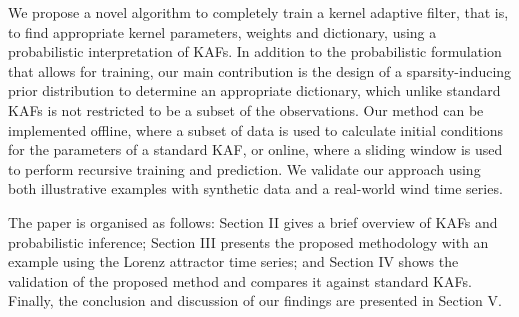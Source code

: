 We propose a novel algorithm to completely train a kernel adaptive filter, that is, to find appropriate kernel parameters, weights and dictionary, using a probabilistic interpretation of KAFs. In addition to the probabilistic formulation that allows for training, our main contribution is the design of a sparsity-inducing prior distribution to determine an appropriate dictionary, which unlike standard KAFs is not restricted to be a subset of the observations. Our method can be implemented offline, where a subset of data is used to calculate initial conditions for the parameters of a standard KAF, or online, where a sliding window is used to perform recursive training and prediction.  We validate our approach using both illustrative examples with synthetic data and a real-world wind time series.

The paper is organised as follows: Section II gives a brief overview of KAFs and probabilistic inference; Section III presents the proposed methodology with an example using the Lorenz attractor time series; and Section IV shows the validation of the proposed method and compares it against standard KAFs. Finally, the conclusion and discussion of our findings are presented in Section V.